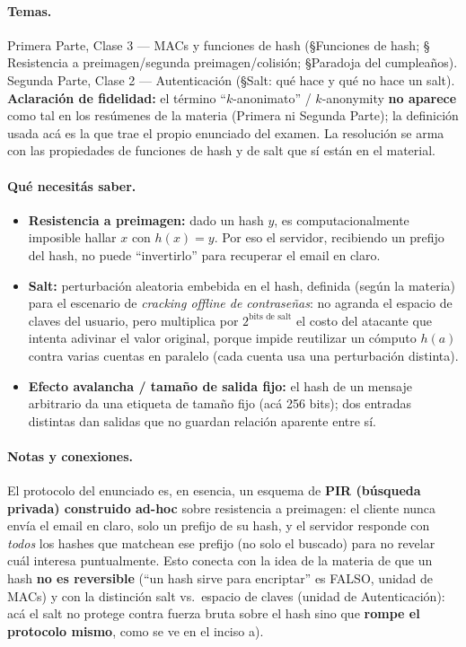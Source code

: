\paragraph{Temas.}
Primera Parte, Clase 3 --- MACs y funciones de hash (\S Funciones de hash; \S
Resistencia a preimagen/segunda preimagen/colisión; \S Paradoja del cumpleaños).
Segunda Parte, Clase 2 --- Autenticación (\S Salt: qué hace y qué no hace un salt).
\textbf{Aclaración de fidelidad:} el término ``$k$-anonimato'' / $k$-anonymity
\textbf{no aparece} como tal en los resúmenes de la materia (Primera ni Segunda Parte);
la definición usada acá es la que trae el propio enunciado del examen. La resolución se
arma con las propiedades de funciones de hash y de salt que sí están en el material.

\paragraph{Qué necesitás saber.}
\begin{itemize}
  \item \textbf{Resistencia a preimagen:} dado un hash $y$, es computacionalmente
  imposible hallar $x$ con $h(x)=y$. Por eso el servidor, recibiendo un prefijo del
  hash, no puede ``invertirlo'' para recuperar el email en claro.
  \item \textbf{Salt:} perturbación aleatoria embebida en el hash, definida (según la
  materia) para el escenario de \emph{cracking offline de contraseñas}: no agranda el
  espacio de claves del usuario, pero multiplica por $2^{\text{bits de salt}}$ el costo
  del atacante que intenta adivinar el valor original, porque impide reutilizar un
  cómputo $h(a)$ contra varias cuentas en paralelo (cada cuenta usa una perturbación
  distinta).
  \item \textbf{Efecto avalancha / tamaño de salida fijo:} el hash de un mensaje
  arbitrario da una etiqueta de tamaño fijo (acá 256 bits); dos entradas distintas dan
  salidas que no guardan relación aparente entre sí.
\end{itemize}

\paragraph{Notas y conexiones.}
El protocolo del enunciado es, en esencia, un esquema de \textbf{PIR (búsqueda privada)
construido ad-hoc} sobre resistencia a preimagen: el cliente nunca envía el email en
claro, solo un prefijo de su hash, y el servidor responde con \emph{todos} los hashes
que matchean ese prefijo (no solo el buscado) para no revelar cuál interesa
puntualmente. Esto conecta con la idea de la materia de que un hash \textbf{no es
reversible} (``un hash sirve para encriptar'' es FALSO, unidad de MACs) y con la
distinción salt vs.\ espacio de claves (unidad de Autenticación): acá el salt no
protege contra fuerza bruta sobre el hash sino que \textbf{rompe el protocolo mismo},
como se ve en el inciso a).

